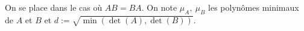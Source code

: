 





On se place dans le cas où $AB=BA$. On note $\mu_A,\: \mu_B$ les polynômes minimaux de $A$ et $B$ et $d:= \sqrt{\min \left(\det(A), \det(B)\right)}.$

